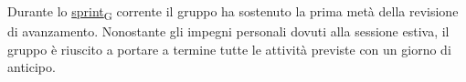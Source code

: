 Durante lo \href{https://7last.github.io/docs/rtb/documentazione-interna/glossario\#sprint}{sprint\textsubscript{G}} corrente il gruppo ha sostenuto la prima metà della revisione di avanzamento. Nonostante gli impegni personali dovuti alla sessione estiva, il gruppo è riuscito a portare a termine tutte le attività previste con un giorno di anticipo.



%
%

